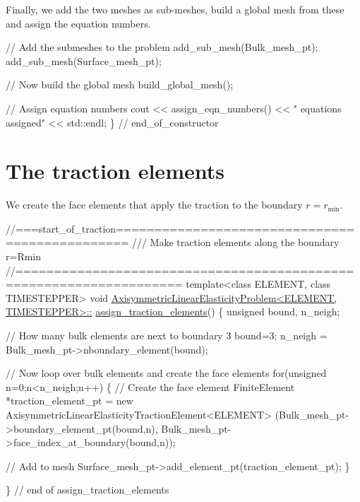 Finally, we add the two meshes as sub-\/meshes, build a global mesh from these and assign the equation numbers.


\begin{DoxyCodeInclude}
 \textcolor{comment}{// Add the submeshes to the problem}
 add\_sub\_mesh(Bulk\_mesh\_pt);
 add\_sub\_mesh(Surface\_mesh\_pt);

 \textcolor{comment}{// Now build the global mesh}
 build\_global\_mesh();

 \textcolor{comment}{// Assign equation numbers}
 cout << assign\_eqn\_numbers() << \textcolor{stringliteral}{" equations assigned"} << std::endl; 
\} \textcolor{comment}{// end\_of\_constructor}

\end{DoxyCodeInclude}




 

\hypertarget{index_traction_elements}{}\section{The traction elements}\label{index_traction_elements}
We create the face elements that apply the traction to the boundary $ r=r_\mathrm{min} $.


\begin{DoxyCodeInclude}
\textcolor{comment}{//===start\_of\_traction===============================================}
\textcolor{comment}{/// Make traction elements along the boundary r=Rmin}
\textcolor{comment}{}\textcolor{comment}{//===================================================================}
\textcolor{keyword}{template}<\textcolor{keyword}{class} ELEMENT, \textcolor{keyword}{class} TIMESTEPPER>
\textcolor{keywordtype}{void} \hyperlink{classAxisymmetricLinearElasticityProblem_ab0cfde2632d6711b75744bcc2644ae04}{AxisymmetricLinearElasticityProblem<ELEMENT, TIMESTEPPER>::}
\hyperlink{classAxisymmetricLinearElasticityProblem_ab0cfde2632d6711b75744bcc2644ae04}{assign\_traction\_elements}()
\{
 \textcolor{keywordtype}{unsigned} bound, n\_neigh;

 \textcolor{comment}{// How many bulk elements are next to boundary 3}
 bound=3;
 n\_neigh = Bulk\_mesh\_pt->nboundary\_element(bound); 

 \textcolor{comment}{// Now loop over bulk elements and create the face elements}
 \textcolor{keywordflow}{for}(\textcolor{keywordtype}{unsigned} n=0;n<n\_neigh;n++)
  \{
   \textcolor{comment}{// Create the face element}
   FiniteElement *traction\_element\_pt 
    = \textcolor{keyword}{new} AxisymmetricLinearElasticityTractionElement<ELEMENT>
    (Bulk\_mesh\_pt->boundary\_element\_pt(bound,n),
     Bulk\_mesh\_pt->face\_index\_at\_boundary(bound,n));
 
   \textcolor{comment}{// Add to mesh}
   Surface\_mesh\_pt->add\_element\_pt(traction\_element\_pt);
  \}

\} \textcolor{comment}{// end of assign\_traction\_elements}

\end{DoxyCodeInclude}




